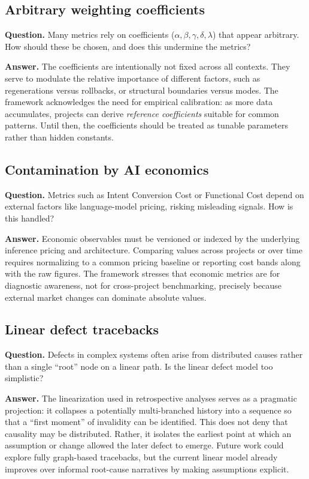 \documentclass[twocolumn]{aastex701}
\begin{document}
\subsection{Arbitrary weighting coefficients}
\textbf{Question.} Many metrics rely on coefficients ($\alpha,\beta,\gamma,\delta,\lambda$) that appear arbitrary.  How should these be chosen, and does this undermine the metrics?

\textbf{Answer.}  The coefficients are intentionally not fixed across all
contexts.  They serve to modulate the relative importance of different
factors, such as regenerations versus rollbacks, or structural
boundaries versus modes.  The framework acknowledges the need for
empirical calibration: as more data accumulates, projects can derive
\emph{reference coefficients} suitable for common patterns.  Until
then, the coefficients should be treated as tunable parameters rather
than hidden constants.

\subsection{Contamination by AI economics}
\textbf{Question.}  Metrics such as Intent Conversion Cost or Functional
Cost depend on external factors like language-model pricing, risking
misleading signals.  How is this handled?

\textbf{Answer.}  Economic observables must be versioned or indexed by
the underlying inference pricing and architecture.  Comparing values
across projects or over time requires normalizing to a common pricing
baseline or reporting cost bands along with the raw figures.  The
framework stresses that economic metrics are for diagnostic awareness,
not for cross-project benchmarking, precisely because external market
changes can dominate absolute values.

\subsection{Linear defect tracebacks}
\textbf{Question.}  Defects in complex systems often arise from
distributed causes rather than a single “root” node on a linear path.
Is the linear defect model too simplistic?

\textbf{Answer.}  The linearization used in retrospective analyses
serves as a pragmatic projection: it collapses a potentially
multi-branched history into a sequence so that a “first moment” of
invalidity can be identified.  This does not deny that causality may be
distributed.  Rather, it isolates the earliest point at which an
assumption or change allowed the later defect to emerge.  Future work
could explore fully graph-based tracebacks, but the current linear model
already improves over informal root-cause narratives by making
assumptions explicit.
\end{document}

